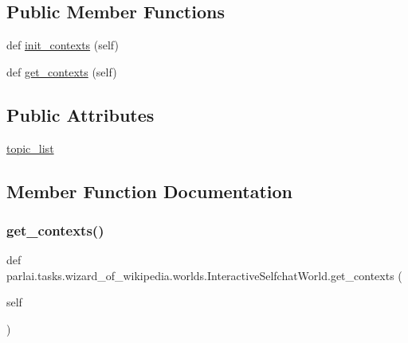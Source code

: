 \subsection*{Public Member Functions}
\begin{DoxyCompactItemize}
\item 
def \hyperlink{classparlai_1_1tasks_1_1wizard__of__wikipedia_1_1worlds_1_1InteractiveSelfchatWorld_a7c8bb5adb1d2d5a94852dd205457dc6b}{init\+\_\+contexts} (self)
\item 
def \hyperlink{classparlai_1_1tasks_1_1wizard__of__wikipedia_1_1worlds_1_1InteractiveSelfchatWorld_ac2a96e3d645041e1e03add8c5cc7ed60}{get\+\_\+contexts} (self)
\end{DoxyCompactItemize}
\subsection*{Public Attributes}
\begin{DoxyCompactItemize}
\item 
\hyperlink{classparlai_1_1tasks_1_1wizard__of__wikipedia_1_1worlds_1_1InteractiveSelfchatWorld_a50745d66f073be01963f68411a94a06b}{topic\+\_\+list}
\end{DoxyCompactItemize}


\subsection{Member Function Documentation}
\mbox{\label{classparlai_1_1tasks_1_1wizard__of__wikipedia_1_1worlds_1_1InteractiveSelfchatWorld_ac2a96e3d645041e1e03add8c5cc7ed60}} 
\subsubsection{\texorpdfstring{get\+\_\+contexts()}{get\_contexts()}}
{\footnotesize\ttfamily def parlai.\+tasks.\+wizard\+\_\+of\+\_\+wikipedia.\+worlds.\+Interactive\+Selfchat\+World.\+get\+\_\+contexts (\begin{DoxyParamCaption}\item[{}]{self }\end{DoxyParamCaption})}

